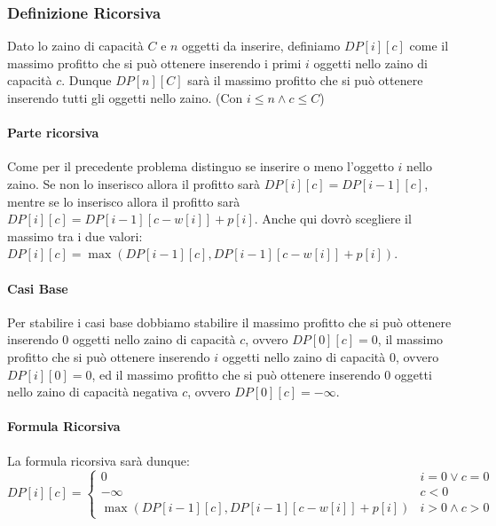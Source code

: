             \subsubsection{Definizione Ricorsiva}
                Dato lo zaino di capacità $C$ e $n$ oggetti da inserire, definiamo $DP[i][c]$ come il massimo profitto che si può ottenere inserendo i primi $i$ oggetti nello zaino di capacità $c$. Dunque $DP[n][C]$ sarà il massimo profitto che si può ottenere inserendo tutti gli oggetti nello zaino. (Con $i\leq n\land c\leq C$)
                \paragraph{Parte ricorsiva} Come per il precedente problema distinguo se inserire o meno l'oggetto $i$ nello zaino. Se non lo inserisco allora il profitto sarà $DP[i][c]=DP[i-1][c]$, mentre se lo inserisco allora il profitto sarà $DP[i][c]=DP[i-1][c-w[i]]+p[i]$. Anche qui dovrò scegliere il massimo tra i due valori: $DP[i][c]=\max(DP[i-1][c], DP[i-1][c-w[i]]+p[i])$.
                \paragraph{Casi Base} Per stabilire i casi base dobbiamo stabilire il massimo profitto che si può ottenere inserendo $0$ oggetti nello zaino di capacità $c$, ovvero $DP[0][c]=0$, il massimo profitto che si può ottenere inserendo $i$ oggetti nello zaino di capacità $0$, ovvero $DP[i][0]=0$, ed il massimo profitto che si può ottenere inserendo $0$ oggetti nello zaino di capacità negativa $c$, ovvero $DP[0][c]=-\infty$.
                \paragraph{Formula Ricorsiva} La formula ricorsiva sarà dunque:
                $$
                    DP[i][c]=\begin{cases}
                        0 & i=0\lor c=0 \\
                        -\infty & c<0 \\
                        \max(DP[i-1][c], DP[i-1][c-w[i]]+p[i]) & i>0\land c>0
                    \end{cases}
                $$
